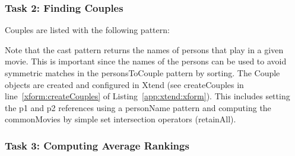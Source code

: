 \begin{figure}[!t]
    \begin{minipage}{.32\textwidth}
	\end{minipage}    
    \begin{minipage}{.32\textwidth}
	\end{minipage}    
    \begin{minipage}{.32\textwidth}
	\end{minipage}    
\end{figure}

\subsubsection{Task 2: Finding Couples}
\label{t2}

Couples are listed with the following pattern:

\begin{figure}[!t]
    \begin{minipage}{.50\textwidth}
    \end{minipage}
    \hspace{0.03\textwidth}
    \begin{minipage}{.48\textwidth}
    \end{minipage}
\end{figure}

Note that the \textsf{cast} pattern returns the names of persons that play in a given movie. This is important since the names of the persons can be used to avoid symmetric matches in the \textsf{personsToCouple} pattern by sorting.
The \textsf{Couple} objects are created and configured in Xtend (see \textsf{createCouples} in line~\ref{xform:createCouples} of Listing~\ref{app:xtend:xform}). This includes setting the \textsf{p1} and \textsf{p2} references using a \textsf{personName} pattern and computing the \textsf{commonMovies} by simple set intersection operators (\textsf{retainAll}).

\subsubsection{Task 3: Computing Average Rankings}
\label{t3}

